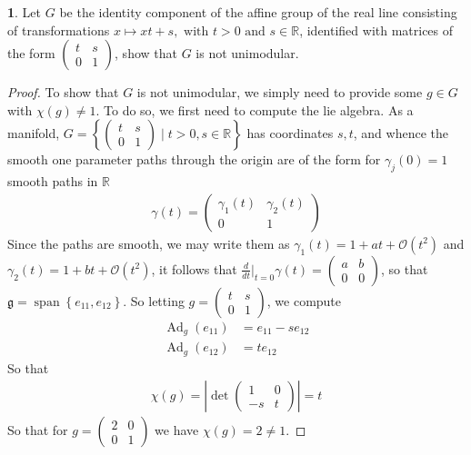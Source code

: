 \documentclass[10.5pt]{article}
\theoremstyle{definition}
\newtheorem{pb}{}
\newcommand{\set}[1]{\left\{#1\right\}}
\newcommand{\abs}[1]{\left\vert#1\right\vert}
\newcommand{\tand}{\text{ and }}
\begin{document}
    \begin{pb} Let \(G\) be the identity component of the affine group of the real line consisting of transformations \(x \mapsto xt + s, \text{ with } t > 0 \tand s \in \mathbb{R}\), identified with matrices of the form \(\begin{pmatrix} t & s \\ 0 & 1 \end{pmatrix}\), show that \(G\) is not unimodular.
        \begin{proof}
            To show that \(G\) is not unimodular, we simply need to provide some \(g \in G\) with \(\chi(g) \neq 1\). To do so, we first need to compute the lie algebra. As a manifold, \(G = \set{\begin{pmatrix} t & s \\ 0 & 1 \end{pmatrix}\mid t > 0, s \in \mathbb{R}}\) has coordinates \(s,t\), and whence the smooth one parameter paths through the origin are of the form for \(\gamma_j(0) = 1\) smooth paths in \(\mathbb{R}\)
        \begin{align*}
            \gamma(t) = \begin{pmatrix} \gamma_1(t) & \gamma_2(t) \\ 0 & 1 \end{pmatrix}
        \end{align*}
        Since the paths are smooth, we may write them as \(\gamma_1(t) = 1 + at + \mathcal{O}(t^2)\) and \(\gamma_2(t) = 1 + bt + \mathcal{O}(t^2)\), it follows that \(\frac{d}{dt}\vert_{t=0}\gamma(t) = \begin{pmatrix} a & b \\ 0 & 0 \end{pmatrix}\), so that \(\mathfrak{g} = \operatorname{span}\set{e_{11},e_{12}}\). So letting \(g = \begin{pmatrix} t & s \\ 0 & 1 \end{pmatrix}\), we compute
        \begin{align*}
            \operatorname{Ad}_g(e_{11}) &= e_{11} - se_{12} \\
            \operatorname{Ad}_g(e_{12}) &= te_{12}
        \end{align*}
        So that
        \begin{align*}
            \chi(g) = \abs{\det \begin{pmatrix} 1 & 0 \\ -s & t \end{pmatrix}} = t
        \end{align*}
        So that for \(g = \begin{pmatrix} 2 & 0 \\ 0 & 1 \end{pmatrix}\) we have \(\chi(g) = 2 \neq 1\).
        \end{proof}
    \end{pb}
\end{document}
